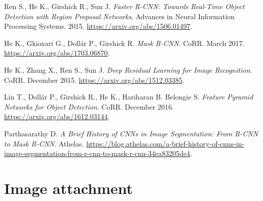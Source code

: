 \documentclass[journal, onecolumn, a4paper]{IEEEtran}
\begin{document}
\begin{thebibliography}{5}
	Ren S., He K., Girshick R., Sun J. {\em Faster R-CNN: Towards Real-Time Object Detection with Region Proposal Networks}. Advances in Neural Information Processing Systems. 2015.
	\url{https://arxiv.org/abs/1506.01497}.

	He K., Gkioxari G., Dollár P., Girshick R. {\em Mask R-CNN}. CoRR. March 2017.
	\url{https://arxiv.org/abs/1703.06870}.

	He K., Zhang X., Ren S., Sun J. {\em Deep Residual Learning for Image Recognition}. CoRR. December 2015.
	\url{https://arxiv.org/abs/1512.03385}.

	Lin T., Dollár P., Girshick R., He K., Hariharan B. Belongie S. {\em Feature Pyramid Networks for Object Detection}. CoRR. December 2016.
	\url{https://arxiv.org/abs/1612.03144}.

	Parthasarathy D. {\em A Brief History of CNNs in Image Segmentation: From R-CNN to Mask R-CNN}. Athelas.
	\url{https://blog.athelas.com/a-brief-history-of-cnns-in-image-segmentation-from-r-cnn-to-mask-r-cnn-34ea83205de4}.

\end{thebibliography}

\newpage
\appendices

\section{Image attachment}

\begin{figure}[h]
\hfill
{}
\hfill
{}
\hfill
\end{figure}
\end{document}
